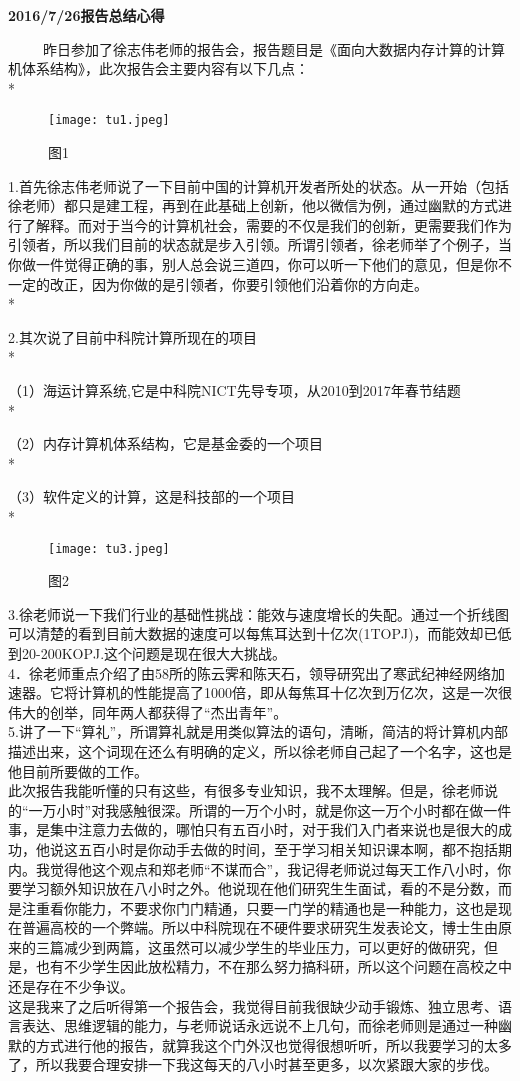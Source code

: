 \documentclass{article}
\begin{document}
\begin{center}
\color{red}
\huge
{\textbf{2016/7/26报告总结心得}}
\end{center}
~~~~~{昨日参加了徐志伟老师的报告会，报告题目是《面向大数据内存计算的计算机体系结构》，此次报告会主要内容有以下几点：}\\*
\begin{figure}[!htb] 
\centering
\texttt{[image: tu1.jpeg]}
\caption{图1}
\end{figure}

1.首先徐志伟老师说了一下目前中国的计算机开发者所处的状态。从一开始（包括徐老师）都只是建工程，再到在此基础上创新，他以微信为例，通过幽默的方式进行了解释。而对于当今的计算机社会，需要的不仅是我们的创新，更需要我们作为引领者，所以我们目前的状态就是步入引领。所谓引领者，徐老师举了个例子，当你做一件觉得正确的事，别人总会说三道四，你可以听一下他们的意见，但是你不一定的改正，因为你做的是引领者，你要引领他们沿着你的方向走。\\*

2.其次说了目前中科院计算所现在的项目\\*

（1）海运计算系统,它是中科院NICT先导专项，从2010到2017年春节结题\\*

（2）内存计算机体系结构，它是基金委的一个项目\\*

（3）软件定义的计算，这是科技部的一个项目\\*
\begin{figure}[!htb]
\centering
\texttt{[image: tu3.jpeg]}
\caption{图2}
\end{figure} 

3.徐老师说一下我们行业的基础性挑战：能效与速度增长的失配。通过一个折线图可以清楚的看到目前大数据的速度可以每焦耳达到十亿次(1TOPJ)，而能效却已低到20-200KOPJ.这个问题是现在很大大挑战。\\
  
4．徐老师重点介绍了由58所的陈云霁和陈天石，领导研究出了寒武纪神经网络加速器。它将计算机的性能提高了1000倍，即从每焦耳十亿次到万亿次，这是一次很伟大的创举，同年两人都获得了“杰出青年”。\\
  
5.讲了一下“算礼”，所谓算礼就是用类似算法的语句，清晰，简洁的将计算机内部描述出来，这个词现在还么有明确的定义，所以徐老师自己起了一个名字，这也是他目前所要做的工作。\\
  
此次报告我能听懂的只有这些，有很多专业知识，我不太理解。但是，徐老师说的“一万小时”对我感触很深。所谓的一万个小时，就是你这一万个小时都在做一件事，是集中注意力去做的，哪怕只有五百小时，对于我们入门者来说也是很大的成功，他说这五百小时是你动手去做的时间，至于学习相关知识课本啊，都不抱括期内。我觉得他这个观点和郑老师“不谋而合”，我记得老师说过每天工作八小时，你要学习额外知识放在八小时之外。他说现在他们研究生生面试，看的不是分数，而是注重看你能力，不要求你门门精通，只要一门学的精通也是一种能力，这也是现在普遍高校的一个弊端。所以中科院现在不硬件要求研究生发表论文，博士生由原来的三篇减少到两篇，这虽然可以减少学生的毕业压力，可以更好的做研究，但是，也有不少学生因此放松精力，不在那么努力搞科研，所以这个问题在高校之中还是存在不少争议。\\
  
这是我来了之后听得第一个报告会，我觉得目前我很缺少动手锻炼、独立思考、语言表达、思维逻辑的能力，与老师说话永远说不上几句，而徐老师则是通过一种幽默的方式进行他的报告，就算我这个门外汉也觉得很想听听，所以我要学习的太多了，所以我要合理安排一下我这每天的八小时甚至更多，以次紧跟大家的步伐。
\end{document}
